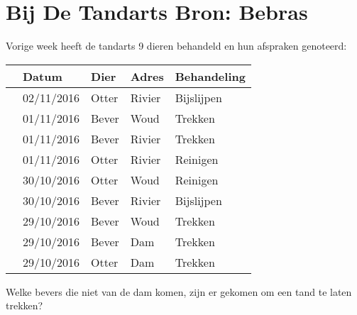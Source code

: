 \documentclass[12pt, a4paper]{article}
\begin{document}
	\begin{minipage}{\textwidth}
		\section{Bij De Tandarts \hfill\small Bron: Bebras}
			Vorige week heeft de tandarts 9 dieren behandeld en hun afspraken genoteerd:
			
			\begin{table}[H]
				\centering
				\begin{tabular}{|l|l|l|l|l|}
					\hline
					\ding{51} & \textbf{Datum} & \textbf{Dier} & \textbf{Adres} & \textbf{Behandeling} \\ \hline\hline
					&02/11/2016 & Otter & Rivier & Bijslijpen \\
					&01/11/2016 & Bever & Woud & Trekken \\
					&01/11/2016 & Bever & Rivier & Trekken \\	
					&01/11/2016 & Otter & Rivier & Reinigen \\
					&30/10/2016 & Otter & Woud & Reinigen \\
					&30/10/2016 & Bever & Rivier & Bijslijpen \\
					&29/10/2016 & Bever & Woud & Trekken \\
					&29/10/2016 & Bever & Dam & Trekken \\
					&29/10/2016 & Otter & Dam & Trekken \\
					\hline 
				\end{tabular}
			\end{table}
			
			Welke bevers die niet van de dam komen, zijn er gekomen om een tand te laten trekken?

	\end{minipage} \\ \\ 
		
\end{document}
